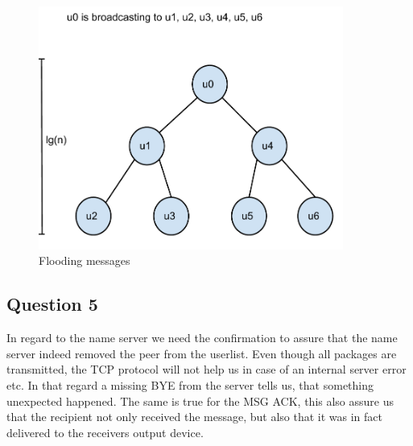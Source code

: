 \begin{figure}[!h]
    \centering
    \includegraphics[width=10cm]{graphics/flooding}
    \caption{Flooding messages}
\end{figure}

\subsection{Question 5}
In regard to the name server we need the confirmation to assure that the name
server indeed removed the peer from the userlist. Even though all packages are
transmitted, the TCP protocol will not help us in case of an internal server
error etc. In that regard a missing BYE from the server tells us, that
something unexpected happened.
The same is true for the MSG ACK, this also assure us that the recipient not
only received the message, but also that it was in fact delivered to the
receivers output device.
